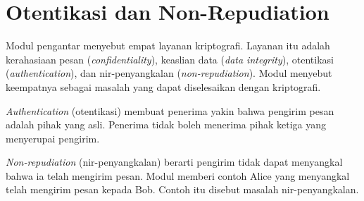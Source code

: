 \section{Otentikasi dan Non-Repudiation}

Modul pengantar menyebut empat layanan kriptografi. Layanan itu adalah
kerahasiaan pesan (\textit{confidentiality}), keaslian data
(\textit{data integrity}), otentikasi (\textit{authentication}), dan
nir-penyangkalan (\textit{non-repudiation}). Modul menyebut keempatnya sebagai
masalah yang dapat diselesaikan dengan kriptografi.

\textit{Authentication} (otentikasi) membuat penerima yakin bahwa pengirim
pesan adalah pihak yang asli. Penerima tidak boleh menerima pihak ketiga yang
menyerupai pengirim.

\textit{Non-repudiation} (nir-penyangkalan) berarti pengirim tidak dapat
menyangkal bahwa ia telah mengirim pesan. Modul memberi contoh Alice yang
menyangkal telah mengirim pesan kepada Bob. Contoh itu disebut masalah
nir-penyangkalan.
